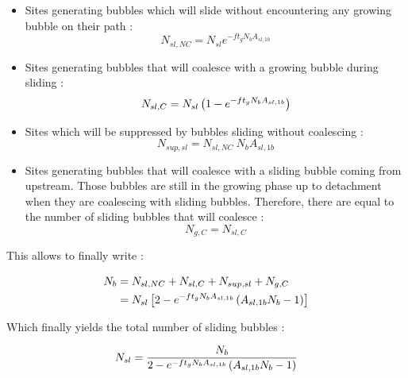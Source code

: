 \begin{itemize}
\item Sites generating bubbles which will slide without encountering any growing bubble on their path : $$N_{sl, NC}=N_{sl}e^{-ft_{g}N_{b}A_{sl,1b}}$$

\item Sites generating bubbles that will coalesce with a growing bubble during sliding : 
$$N_{sl, C}=  N_{sl}\left( 1-e^{-ft_{g}N_{b}A_{sl,1b}} \right)$$

\item Sites which will be suppressed by bubbles sliding without coalescing : $$N_{sup, sl}=N_{sl,NC}\ N_{b}A_{sl,1b}$$

\item Sites generating bubbles that will coalesce with a sliding bubble coming from upstream. Those bubbles are still in the growing phase up to detachment when they are coalescing with sliding bubbles. Therefore, there are equal to the number of sliding bubbles that will coalesce : $$N_{g,C}=N_{sl,C}$$

\end{itemize}

This allows to finally write :

\begin{align}
N_{b}&=N_{sl,NC}+N_{sl,C}+N_{sup,sl} + N_{g,C}\\
%
&=N_{sl}\crocht{2-e^{-ft_{g}N_{b}A_{sl,1b}}\parth{A_{sl,1b}N_{b}-1}}
\end{align}

Which finally yields the total number of sliding bubbles : 

\begin{align}
N_{sl}=\frac{N_{b}}{2-e^{-ft_{g}N_{b}A_{sl,1b}}\left( A_{sl,1b}N_{b}-1 \right)}
\end{align}